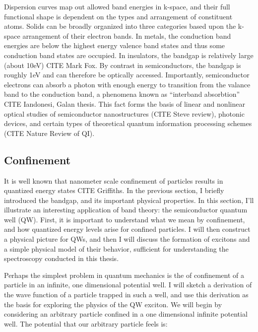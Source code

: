 \indent Dispersion curves map out allowed band energies in k-space, and their full functional shape is dependent on the types and arrangement of constituent atoms.  Solids can be broadly organized into three categories based upon the k-space arrangement of their electron bands. In metals, the conduction band energies are below the highest energy valence band states and thus some conduction band states are occupied. In insulators, the bandgap is relatively large (about 10eV) CITE Mark Fox. By contrast in semiconductors, the bandgap is roughly 1eV and can therefore be optically accessed. Importantly, semiconductor electrons can absorb a photon with enough energy to transition from the valance band to the conduction band, a phenomena known as ``interband absorbtion'' CITE Iandonesi, Galan thesis. This fact forms the basis of linear and nonlinear optical studies of semiconductor nanostructures (CITE Steve review), photonic devices, and certain types of theoretical quantum information processing schemes (CITE Nature Review of QI).


\subsection{Confinement}
\indent It is well known that nanometer scale confinement of particles results in quantized energy states CITE Griffiths. In the previous section, I briefly introduced the bandgap, and its important physical properties. In this section, I'll illustrate an interesting application of band theory: the semiconductor quantum well (QW). First, it is important to understand what we mean by confinement, and how quantized energy levels arise for confined particles. I will then construct a physical picture for QWs, and then I will discuss the formation of excitons and a simple physical model of their behavior, sufficient for understanding the spectroscopy conducted in this thesis.

\indent Perhaps the simplest problem in quantum mechanics is the of confinement of a particle in an infinite, one dimensional potential well. I will sketch a derivation of the wave function of a particle trapped in such a well, and use this derivation as the basis for exploring the physics of the QW exciton. We will begin by considering an arbitrary particle confined in a one dimensional infinite potential well. The potential that our arbitrary particle feels is:


